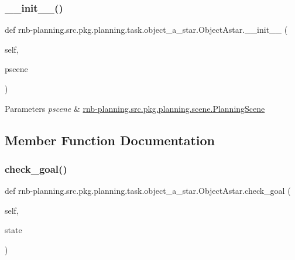 \subsubsection{\texorpdfstring{\+\_\+\+\_\+init\+\_\+\+\_\+()}{\_\_init\_\_()}}
{\footnotesize\ttfamily def rnb-\/planning.\+src.\+pkg.\+planning.\+task.\+object\+\_\+a\+\_\+star.\+Object\+Astar.\+\_\+\+\_\+init\+\_\+\+\_\+ (\begin{DoxyParamCaption}\item[{}]{self,  }\item[{}]{pscene }\end{DoxyParamCaption})}


\begin{DoxyParams}{Parameters}
{\em pscene} & \hyperlink{classrnb-planning_1_1src_1_1pkg_1_1planning_1_1scene_1_1_planning_scene}{rnb-\/planning.\+src.\+pkg.\+planning.\+scene.\+Planning\+Scene} \\
\hline
\end{DoxyParams}


\subsection{Member Function Documentation}
\mbox{\label{classrnb-planning_1_1src_1_1pkg_1_1planning_1_1task_1_1object__a__star_1_1_object_astar_ac76914fa185d66851cf310b3357d8727}} 
\subsubsection{\texorpdfstring{check\+\_\+goal()}{check\_goal()}}
{\footnotesize\ttfamily def rnb-\/planning.\+src.\+pkg.\+planning.\+task.\+object\+\_\+a\+\_\+star.\+Object\+Astar.\+check\+\_\+goal (\begin{DoxyParamCaption}\item[{}]{self,  }\item[{}]{state }\end{DoxyParamCaption})}



